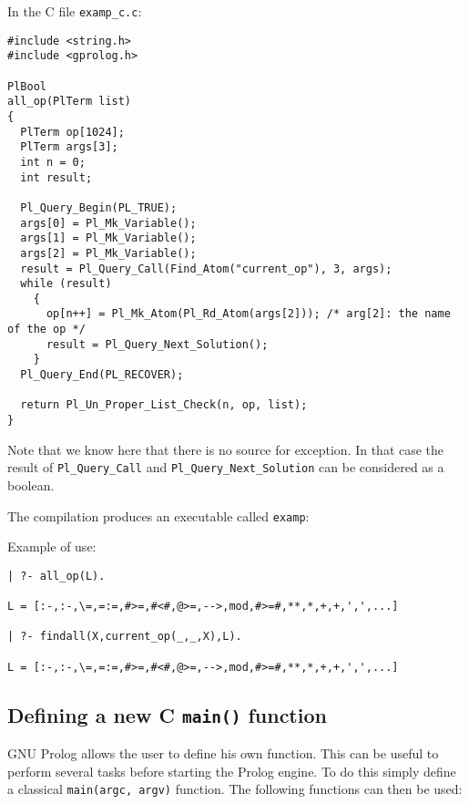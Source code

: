 In the C file \texttt{examp\_c.c}:

\begin{Indentation}
\begin{verbatim}
#include <string.h>
#include <gprolog.h>

PlBool
all_op(PlTerm list)
{
  PlTerm op[1024];
  PlTerm args[3];
  int n = 0;
  int result;

  Pl_Query_Begin(PL_TRUE);
  args[0] = Pl_Mk_Variable();
  args[1] = Pl_Mk_Variable();
  args[2] = Pl_Mk_Variable();
  result = Pl_Query_Call(Find_Atom("current_op"), 3, args);
  while (result)
    {
      op[n++] = Pl_Mk_Atom(Pl_Rd_Atom(args[2])); /* arg[2]: the name of the op */
      result = Pl_Query_Next_Solution();
    }
  Pl_Query_End(PL_RECOVER);

  return Pl_Un_Proper_List_Check(n, op, list);
}
\end{verbatim}
\end{Indentation}

Note that we know here that there is no source for exception. In that case
the result of \texttt{Pl\_Query\_Call} and \texttt{Pl\_Query\_Next\_Solution}
can be considered as a boolean.

The compilation produces an executable called \texttt{examp}:


Example of use:

\begin{Indentation}
\begin{verbatim}
| ?- all_op(L).

L = [:-,:-,\=,=:=,#>=,#<#,@>=,-->,mod,#>=#,**,*,+,+,',',...]

| ?- findall(X,current_op(_,_,X),L).

L = [:-,:-,\=,=:=,#>=,#<#,@>=,-->,mod,#>=#,**,*,+,+,',',...]
\end{verbatim}
\end{Indentation}


\subsection{Defining a new C \texttt{main()} function}

GNU Prolog allows the user to define his own 
function. This can be useful to perform several tasks before starting
the Prolog engine. To do this simply define a classical
\texttt{main(argc, argv)} function. The following functions can then be used:

